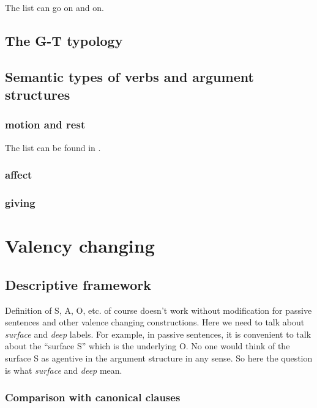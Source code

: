 \documentclass[UTF8, a4paper, oneside, scheme=plain]{ctexart}
\newcommand*{\citechap}[1]{chap.~{#1}}
\newcommand*{\term}[1]{\emph{#1}}
\newcommand{\classify}[1]{{\sc #1}}
\begin{document}
The list can go on and on.

\subsection{The G-T typology}

\subsection{Semantic types of verbs and argument structures}

\subsubsection{\classify{motion} and \classify{rest}}

The list can be found in \citet[\citechap{4}]{dixon2005semantic}.

\subsubsection{\classify{affect}}

\subsubsection{\classify{giving}}


\section{Valency changing}

\subsection{Descriptive framework}\label{sec:valency-changing-theory}

Definition of S, A, O, etc. of course doesn't work without modification
for passive sentences and other valence changing constructions. 
Here we need to talk about \term{surface} and \term{deep} labels.
For example, in passive sentences, 
it is convenient to talk about the ``surface S'' which is the underlying O. 
No one would think of the surface S as agentive in the argument structure in any sense. 
So here the question is what \term{surface} and \term{deep} mean.

\subsubsection{Comparison with canonical clauses}
\end{document}

